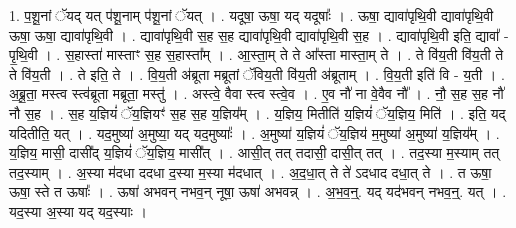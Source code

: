 \documentclass[17pt]{extarticle}
\begin{document}
1. प॒शू॒नां ॅयद् यत् प॑शू॒नाम् प॑शू॒नां ॅयत् । . यदूषा॒ ऊषा॒ यद् यदूषाः᳚ । . ऊषा॒ द्यावा॑पृथि॒वी द्यावा॑पृथि॒वी ऊषा॒ ऊषा॒ द्यावा॑पृथि॒वी । . द्यावा॑पृथि॒वी स॒ह स॒ह द्यावा॑पृथि॒वी द्यावा॑पृथि॒वी स॒ह । . द्यावा॑पृथि॒वी इति॒ द्यावा᳚ - पृ॒थि॒वी । . स॒हास्ता॑ मास्ताꣳ स॒ह स॒हास्ता᳚म् । . आ॒स्ता॒म् ते ते आ᳚स्ता मास्ता॒म् ते । . ते वि॑य॒ती वि॑य॒ती ते ते वि॑य॒ती । . ते इति॒ ते । . वि॒य॒ती अ॑ब्रूता मब्रूतां ॅविय॒ती वि॑य॒ती अ॑ब्रूताम् । . वि॒य॒ती इति॑ वि - य॒ती । . अ॒ब्रू॒ता॒ मस्त्व स्त्व॑ब्रूता मब्रूता॒ मस्तु॑ । . अस्त्वे॒ वैवा स्त्व स्त्वे॒व । . ए॒व नौ॑ ना वे॒वैव नौ᳚ । . नौ॒ स॒ह स॒ह नौ॑ नौ स॒ह । . स॒ह य॒ज्ञियं॑ ॅय॒ज्ञियꣳ॑ स॒ह स॒ह य॒ज्ञिय᳚म् । . य॒ज्ञिय॒ मितीति॑ य॒ज्ञियं॑ ॅय॒ज्ञिय॒ मिति॑ । . इति॒ यद् यदितीति॒ यत् । . यद॒मुष्या॑ अ॒मुष्या॒ यद् यद॒मुष्याः᳚ । . अ॒मुष्या॑ य॒ज्ञियं॑ ॅय॒ज्ञिय॑ म॒मुष्या॑ अ॒मुष्या॑ य॒ज्ञिय᳚म् । . य॒ज्ञिय॒ मासी॒ दासी᳚द् य॒ज्ञियं॑ ॅय॒ज्ञिय॒ मासी᳚त् । . आसी॒त् तत् तदासी॒ दासी॒त् तत् । . तद॒स्या म॒स्याम् तत् तद॒स्याम् । . अ॒स्या म॑दधा ददधा द॒स्या म॒स्या म॑दधात् । . अ॒द॒धा॒त् ते ते॑ ऽदधाद दधा॒त् ते । . त ऊषा॒ ऊषा॒ स्ते त ऊषाः᳚ । . ऊषा॑ अभवन् नभव॒न् नूषा॒ ऊषा॑ अभवन्न् । . अ॒भ॒व॒न्॒. यद् यद॑भवन् नभव॒न्॒. यत् । . यद॒स्या अ॒स्या यद् यद॒स्याः । \newline
\end{document}
